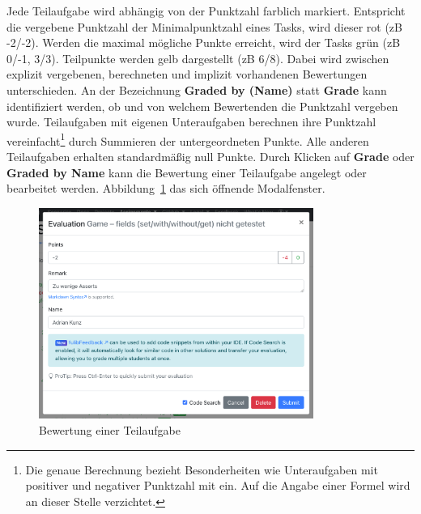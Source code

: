 Jede Teilaufgabe wird abhängig von der Punktzahl farblich markiert.
Entspricht die vergebene Punktzahl der Minimalpunktzahl eines Tasks, wird dieser rot (\ac{zB} -2/-2).
Werden die maximal mögliche Punkte erreicht, wird der Tasks grün (\ac{zB} 0/-1, 3/3).
Teilpunkte werden gelb dargestellt (\ac{zB} 6/8).
Dabei wird zwischen explizit vergebenen, berechneten und implizit vorhandenen Bewertungen unterschieden.
An der Bezeichnung \textbf{Graded by (Name)} statt \textbf{Grade} kann identifiziert werden, ob und von welchem Bewertenden die Punktzahl vergeben wurde.
Teilaufgaben mit eigenen Unteraufgaben berechnen ihre Punktzahl vereinfacht\footnote{
    Die genaue Berechnung bezieht Besonderheiten wie Unteraufgaben mit positiver und negativer Punktzahl mit ein.
    Auf die Angabe einer Formel wird an dieser Stelle verzichtet.
} durch Summieren der untergeordneten Punkte.
Alle anderen Teilaufgaben erhalten standardmäßig null Punkte.
Durch Klicken auf \textbf{Grade} oder \textbf{Graded by Name} kann die Bewertung einer Teilaufgabe angelegt oder bearbeitet werden.
Abbildung~\ref{fig:evaluation-modal} das sich öffnende Modalfenster.

\begin{figure}
    \centering
    \includegraphics[width=0.8\textwidth]{images/evaluation-modal}
    \caption{Bewertung einer Teilaufgabe}
    \label{fig:evaluation-modal}
\end{figure}

